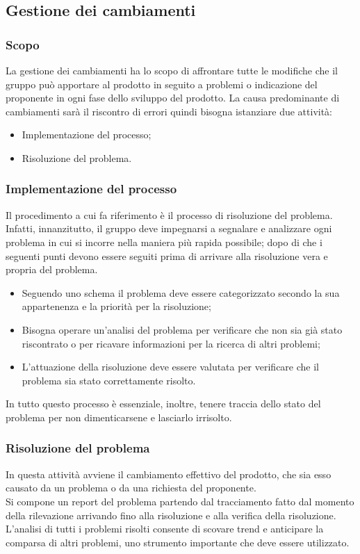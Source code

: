 \subsection{Gestione dei cambiamenti}
\subsubsection{Scopo}
La gestione dei cambiamenti ha lo scopo di affrontare tutte le modifiche che il gruppo può apportare al prodotto in seguito a problemi o indicazione del proponente in ogni fase dello sviluppo del prodotto.
La causa predominante di cambiamenti sarà il riscontro di errori quindi bisogna istanziare due attività: 
\begin{itemize}
    \item Implementazione del processo;
    \item Risoluzione del problema.
\end{itemize}
\subsubsection{Implementazione del processo}
Il procedimento a cui fa riferimento è il processo di risoluzione del problema.
Infatti, innanzitutto, il gruppo deve impegnarsi a segnalare e analizzare ogni problema in cui si incorre nella maniera più rapida possibile; dopo di che i seguenti punti devono essere seguiti prima di arrivare alla risoluzione vera e propria del problema.
\begin{itemize}
    \item Seguendo uno schema il problema deve essere categorizzato secondo la sua appartenenza e la priorità per la risoluzione;
    \item Bisogna operare un'analisi del problema per verificare che non sia già stato riscontrato o per ricavare informazioni per la ricerca di altri problemi;
    \item L'attuazione della risoluzione deve essere valutata per verificare che il problema sia stato correttamente risolto.
\end{itemize}
In tutto questo processo è essenziale, inoltre, tenere traccia dello stato del problema per non dimenticarsene e lasciarlo irrisolto.

\subsubsection{Risoluzione del problema}
In questa attività avviene il cambiamento effettivo del prodotto, che sia esso causato da un problema o da una richiesta del proponente.\\
Si compone un report del problema partendo dal tracciamento fatto dal momento della rilevazione arrivando fino alla risoluzione e alla verifica della risoluzione.\\
L'analisi di tutti i problemi risolti consente di scovare trend e anticipare la comparsa di altri problemi, uno strumento importante che deve essere utilizzato.
